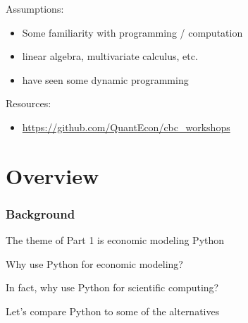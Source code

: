 \begin{frame}


    Assumptions:

    \begin{itemize}
        \item Some familiarity with programming / computation
        \vspace{0.3em}
        \vspace{0.3em}
        \item linear algebra, multivariate calculus, etc.
        \vspace{0.3em}
        \vspace{0.3em}
        \item have seen some dynamic programming
    \end{itemize}

        \vspace{0.3em}
        \vspace{0.3em}
        \vspace{0.3em}
        \vspace{0.3em}
        \vspace{0.3em}
    Resources:

    \begin{itemize}
        \item \url{https://github.com/QuantEcon/cbc_workshops}
    \end{itemize}


\end{frame}




\section{Overview}


\begin{frame}
    \frametitle{Background}

    The theme of Part 1 is economic modeling Python


        \vspace{0.3em}
        \vspace{0.3em}
        \vspace{0.3em}
        \vspace{0.3em}
    Why use Python for economic modeling?

        \vspace{0.3em}
        \vspace{0.3em}
        \vspace{0.3em}
        \vspace{0.3em}
    In fact, why use Python for scientific computing?

        \vspace{0.3em}
        \vspace{0.3em}
        \vspace{0.3em}
        \vspace{0.3em}
    Let's compare Python to some of the alternatives

\end{frame}





